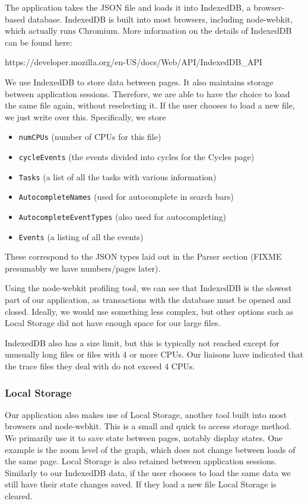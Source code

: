 \documentclass{hmcclinic}
\begin{document}
  The application takes the JSON file and loads it into IndexedDB, a
  browser-based database. IndexedDB is built into most browsers, including
  node-webkit, which actually runs Chromium. More information on the details of IndexedDB can be found here:
\begin{center}
  https://developer.mozilla.org/en-US/docs/Web/API/IndexedDB\_API
\end{center}
  We use IndexedDB to store data between pages. It also
  maintains storage between application sessions. Therefore, we are able to have
  the choice to load the same file again, without reselecting it. If the user
  chooses to load a new file, we just write over this.
  Specifically, we store 
  \begin{itemize}
    \item \texttt{numCPUs} (number of CPUs for this file)
    \item \texttt{cycleEvents} (the events divided into cycles for the Cycles page)
    \item \texttt{Tasks} (a list of all the tasks with various information)
    \item \texttt{AutocompleteNames} (used for autocomplete in search bars)
    \item \texttt{AutocompleteEventTypes} (also used for autocompleting)
    \item \texttt{Events} (a listing of all the events)
  \end{itemize}
  These correspond to the JSON types laid
  out in the Parser section (FIXME presumably we have numbers/pages later).

  Using the node-webkit profiling tool, we can see that IndexedDB is the slowest
  part of our application, as transactions with the database must be opened and
  closed. Ideally, we would use something less complex, but other options such
  as Local Storage did not have enough space for our large files.

  IndexedDB also has  a size limit, but this is typically not reached except for
  unusually long files or files with 4 or more CPUs. Our liaisons have indicated
  that the trace files they deal with do not exceed 4 CPUs.

  \subsubsection{Local Storage}

  Our application also makes use of Local Storage, another tool
  built into most browsers and node-webkit. This is a small and quick to access
  storage method. We primarily use it to save state between pages, notably
  display states. One example is the zoom level of the graph, which does not
  change between loads of the same page. Local Storage is also retained between
  application sessions. Similarly to our IndexedDB data, if the user chooses to
  load the same data we still have their state changes saved. If they load a new
  file Local Storage is cleared.
\end{document}
